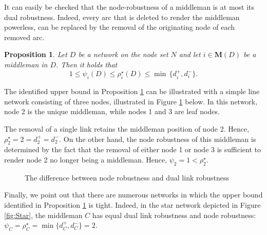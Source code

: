 \documentclass[11pt,fleqn]{article}
\newtheorem{proposition}[theorem]{Proposition}
\begin{document}
\noindent
It can easily be checked that the node-robustness of a middleman is at most its dual robustness. Indeed, every arc that is deleted to render the middleman powerless, can be replaced by the removal of the originating node of each removed arc.
\begin{proposition} \label{prop:NodeBounds}
	Let $D$ be a network on the node set $N$ and let $i \in \mathbf M (D)$ be a middleman in $D$. Then it holds that
	\begin{equation}
		1 \leqslant \psi_i (D) \leqslant \rho^{\star}_i (D) \leqslant \min \, \{ d^+_i , d^-_i \} .
	\end{equation}
\end{proposition}

\noindent
The identified upper bound in Proposition \ref{prop:NodeBounds} can be illustrated with a simple line network consisting of three nodes, illustrated in Figure \ref{fig:Line} below. In this network, node 2 is the unique middleman, while nodes 1 and 3 are leaf nodes.

The removal of a single link retains the middleman position of node 2. Hence, $\rho^{\star}_2 =2 = d^+_2=d^-_2$. On the other hand, the node robustness of this middleman is determined by the fact that the removal of either node 1 or node 3 is sufficient to render node 2 no longer being a middleman. Hence, $\psi_2 = 1 < \rho^{\star}_2$.

\begin{figure}[h]
\begin{center}
\end{center}
\caption{The difference between node robustness and dual link robustness}
\label{fig:Line}
\end{figure}

Finally, we point out that there are numerous networks in which the upper bound identified in Proposition \ref{prop:NodeBounds} is tight. Indeed, in the star network depicted in Figure \ref{fig:Star}, the middleman $C$ has equal dual link robustness and node robustness: $\psi_C = \rho^{\star}_C = \min \{ d^+_C , d^-_C \} = 2$.
\end{document}
